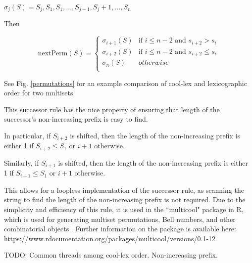\noindent $\sigma_j(S)=S_j,S_1,S_1,\dots,S_{j-1},S_j+1,\dots,S_n $

Then

\begin{equation*}
    \text{nextPerm}(S) = \begin{cases}
	\sigma_{i+1}(S) & \text{if $i \le n-2$ and $s_{i+2} > s_i$}\\
	\sigma_{i+2}(S) & \text{if $i \le n-2$ and $s_{i+2} \le s_i$}\\
	\sigma_{n}(S) & otherwise\\
\end{cases}
\end{equation*}


See Fig. \ref{permutations} for an example comparison of cool-lex and lexicographic order for two multisets.

This successor rule has the nice property of ensuring that length of the successor's non-increasing prefix is easy to find.

In particular, if $S_{i+2}$ is shifted, then the length of the non-increasing prefix is either 1 if $S_{i+2}\le S_1$ or $i+1$ otherwise. 

Similarly, if $S_{i+1}$ is shifted, then the length of the non-increasing prefix is either 1 if $S_{i+1}\le S_1$ or $i+1$ otherwise. 

This allows for a loopless implementation of the successor rule, as scanning the string to find the length of the non-increasing prefix is not required.  Due to the simplicity and efficiency of this rule, it is used in the ``multicool" package in R, which is used for generating multiset permutations, Bell numbers, and other combinatorial objects \cite{multicool_2021}.   Further information on the package is available here: https://www.rdocumentation.org/packages/multicool/versions/0.1-12

TODO: Common threads among cool-lex order. Non-increasing prefix. 

% 


